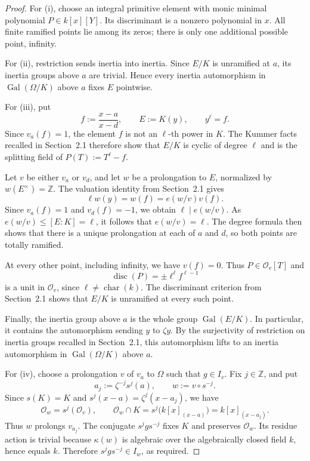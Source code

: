 \documentclass[11pt,a4paper]{amsart}
\renewcommand{\leq}{\leqslant}
\theoremstyle{definition}
\newcommand{\Z}{\mathbb Z}
\DeclareMathOperator{\Gal}{Gal}
\begin{document}
\begin{proof}
For (i), choose an integral primitive element with monic minimal polynomial $P\in k[x][Y]$. Its discriminant is a nonzero polynomial in $x$. All finite ramified points lie among its zeros; there is only one additional possible point, infinity.

For (ii), restriction sends inertia into inertia.
Since $E/K$ is unramified at $a$, its inertia groups above
$a$ are trivial. Hence every inertia automorphism in
$\Gal(\Omega/K)$ above $a$ fixes $E$ pointwise.

For (iii), put
\[
f:=\frac{x-a}{x-d},\qquad E:=K(y),\qquad y^\ell=f.
\]
Since $v_a(f)=1$, the element $f$ is not an $\ell$-th power
in $K$. The Kummer facts recalled in Section~2.1 therefore
show that $E/K$ is cyclic of degree $\ell$ and is the
splitting field of $P(T):=T^\ell-f$.

Let $v$ be either $v_a$ or $v_d$, and let $w$ be a
prolongation to $E$, normalized by $w(E^\times)=\Z$.
The valuation identity from Section~2.1 gives
\[
\ell w(y)=w(f)=e(w/v)v(f).
\]
Since $v_a(f)=1$ and $v_d(f)=-1$, we obtain
$\ell\mid e(w/v)$. As $e(w/v)\leq [E:K]=\ell$,
it follows that $e(w/v)=\ell$. The degree formula then
shows that there is a unique prolongation at each of
$a$ and $d$, so both points are totally ramified.

At every other point, including infinity, we have $v(f)=0$.
Thus $P\in\mathcal O_v[T]$ and
\[
\operatorname{disc}(P)=\pm\ell^\ell f^{\ell-1}
\]
is a unit in $\mathcal O_v$, since $\ell\ne\operatorname{char}(k)$.
The discriminant criterion from Section~2.1 shows that
$E/K$ is unramified at every such point.

Finally, the inertia group above $a$ is the whole group
$\operatorname{Gal}(E/K)$. In particular, it contains the
automorphism sending $y$ to $\zeta y$.
By the surjectivity of restriction on inertia groups recalled
in Section~2.1, this automorphism lifts to an inertia
automorphism in $\Gal(\Omega/K)$ above $a$.

For (iv), choose a prolongation $v$ of $v_a$ to $\Omega$
such that $g\in I_v$. Fix $j\in\Z$, and put
\[
a_j:=\zeta^{-j}s^j(a),\qquad w:=v\circ s^{-j}.
\]
Since $s(K)=K$ and
$s^j(x-a)=\zeta^j(x-a_j)$, we have
\[
\mathcal O_w=s^j(\mathcal O_v),\qquad
\mathcal O_w\cap K
=s^j\bigl(k[x]_{(x-a)}\bigr)
=k[x]_{(x-a_j)}.
\]
Thus $w$ prolongs $v_{a_j}$.
The conjugate $s^jgs^{-j}$ fixes $K$ and preserves
$\mathcal O_w$. Its residue action is trivial because
$\kappa(w)$ is algebraic over the algebraically closed
field $k$, hence equals $k$.
Therefore $s^jgs^{-j}\in I_w$, as required.
\end{proof}
\end{document}
